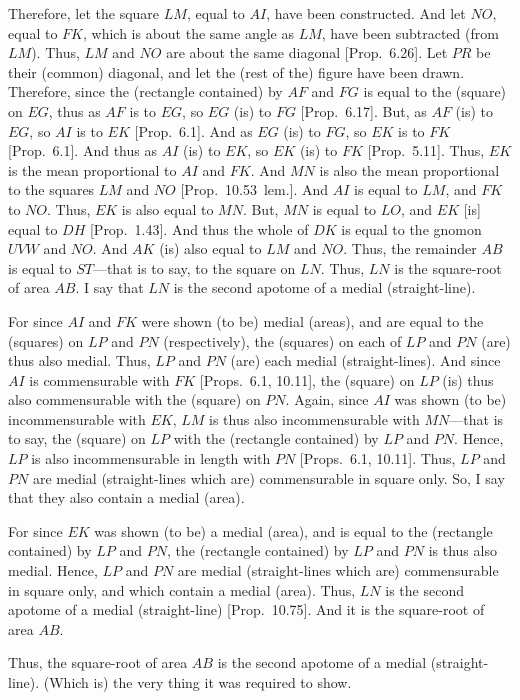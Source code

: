 Therefore, let the square $LM$, equal to $AI$, have been constructed. And
let $NO$, equal to $FK$, which is about the same angle as $LM$, have
been subtracted (from $LM$). Thus, $LM$ and $NO$ are about the same
diagonal [Prop.~6.26]. Let $PR$ be their (common) diagonal,
and let the (rest of the) figure have been drawn. Therefore, since
the (rectangle contained) by $AF$ and $FG$ is equal to the (square) on
$EG$, thus as $AF$ is to $EG$, so $EG$ (is) to $FG$
[Prop.~6.17]. But, as $AF$ (is) to $EG$, so
$AI$ is to $EK$ [Prop.~6.1]. And as $EG$ (is)
to $FG$, so $EK$ is to $FK$ [Prop.~6.1]. And thus
as $AI$ (is) to $EK$, so $EK$ (is) to $FK$ [Prop.~5.11]. Thus, $EK$
is the mean proportional to $AI$ and $FK$. And $MN$ is also the
mean proportional to the squares $LM$ and $NO$ [Prop.~10.53~lem.]. And $AI$
is equal to $LM$, and $FK$ to $NO$. Thus, $EK$ is also equal to $MN$.
But, $MN$ is equal to $LO$, and $EK$ [is] equal to $DH$ [Prop.~1.43]. And thus the whole
of $DK$ is equal to the gnomon $UVW$ and $NO$. And $AK$ (is) also
equal to $LM$ and $NO$. Thus, the remainder $AB$ is equal to $ST$---that 
is to say, to the square on $LN$. Thus, $LN$ is the square-root of area $AB$.
I say that $LN$ is the second apotome of a medial (straight-line).

For since $AI$ and $FK$ were shown (to be)
medial (areas), and are equal to the (squares) on $LP$ and $PN$ (respectively), the (squares) on each of $LP$ and $PN$ (are) thus also
medial. Thus, $LP$ and $PN$ (are) each medial (straight-lines).
And since $AI$ is commensurable with $FK$ [Props.~6.1, 10.11], the (square) on $LP$
(is) thus also commensurable with the (square) on $PN$.  Again, since
$AI$ was shown (to be) incommensurable with $EK$, $LM$ is thus
also incommensurable with $MN$---that is to say, the (square) on 
$LP$ with the (rectangle contained) by $LP$ and $PN$.
Hence, $LP$ is also incommensurable in length with $PN$ [Props.~6.1, 10.11]. Thus, $LP$ and $PN$
are medial (straight-lines which are) commensurable in square only.
So, I say that they also contain a medial (area).

For since $EK$ was shown (to be) a medial (area), and is equal to the
(rectangle contained) by $LP$ and $PN$, the (rectangle contained) by
$LP$ and $PN$ is thus also medial. Hence, $LP$ and $PN$
are medial (straight-lines which are) commensurable in square only, and
which contain a medial (area). Thus, $LN$ is the
second apotome of a medial (straight-line) [Prop.~10.75]. And it is the square-root of area
$AB$.

Thus, the square-root of area $AB$ is the second apotome of a medial (straight-line). (Which is) the very thing it was required to show.

